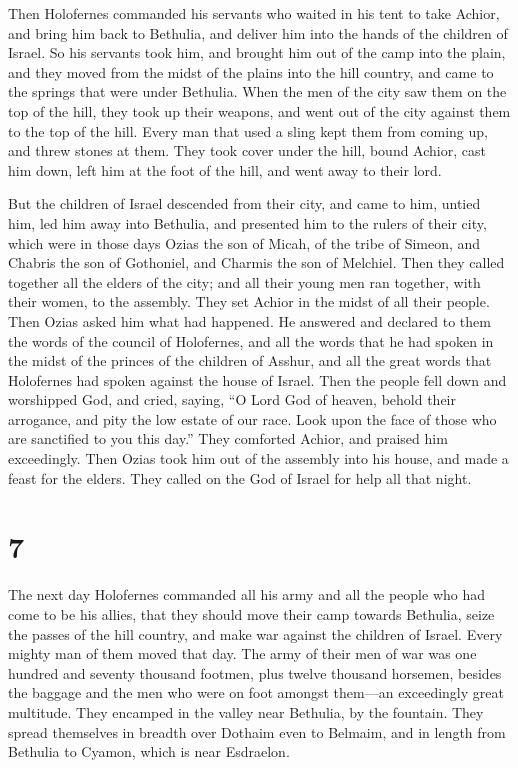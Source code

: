  Then Holofernes commanded his servants who waited in his
tent to take Achior, and bring him back to Bethulia, and deliver him
into the hands of the children of Israel.  So his servants
took him, and brought him out of the camp into the plain, and they moved
from the midst of the plains into the hill country, and came to the
springs that were under Bethulia.  When the men of the city
saw them on the top of the hill, they took up their weapons, and went
out of the city against them to the top of the hill. Every man that used
a sling kept them from coming up, and threw stones at them.
 They took cover under the hill, bound Achior, cast him
down, left him at the foot of the hill, and went away to their lord.

 But the children of Israel descended from their city, and
came to him, untied him, led him away into Bethulia, and presented him
to the rulers of their city,  which were in those days
Ozias the son of Micah, of the tribe of Simeon, and Chabris the son of
Gothoniel, and Charmis the son of Melchiel.  Then they
called together all the elders of the city; and all their young men ran
together, with their women, to the assembly. They set Achior in the
midst of all their people. Then Ozias asked him what had happened.
 He answered and declared to them the words of the council
of Holofernes, and all the words that he had spoken in the midst of the
princes of the children of Asshur, and all the great words that
Holofernes had spoken against the house of Israel.  Then
the people fell down and worshipped God, and cried, saying,
 ``O Lord God of heaven, behold their arrogance, and pity
the low estate of our race. Look upon the face of those who are
sanctified to you this day.''  They comforted Achior, and
praised him exceedingly.  Then Ozias took him out of the
assembly into his house, and made a feast for the elders. They called on
the God of Israel for help all that night.

\hypertarget{section-6}{%
\section{7}\label{section-6}}

 The next day Holofernes commanded all his army and all the
people who had come to be his allies, that they should move their camp
towards Bethulia, seize the passes of the hill country, and make war
against the children of Israel.  Every mighty man of them
moved that day. The army of their men of war was one hundred and seventy
thousand footmen, plus twelve thousand horsemen, besides the baggage and
the men who were on foot amongst them---an exceedingly great multitude.
 They encamped in the valley near Bethulia, by the fountain.
They spread themselves in breadth over Dothaim even to Belmaim, and in
length from Bethulia to Cyamon, which is near Esdraelon.

